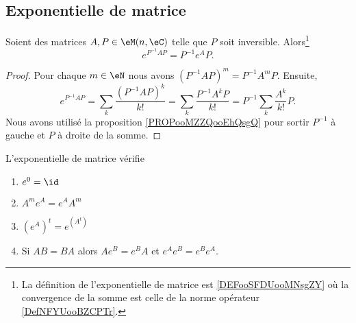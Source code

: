 \subsection{Exponentielle de matrice}
\label{SECooBYQBooZifJsg}

\begin{proposition}
    Soient des matrices \( A,P\in \eM(n,\eC)\) telle que \( P\) soit inversible. Alors\footnote{La définition de l'exponentielle de matrice est \ref{DEFooSFDUooMNsgZY} où la convergence de la somme est celle de la norme opérateur \ref{DefNFYUooBZCPTr}.}
    \begin{equation}
        e^{P^{-1}AP}=P^{-1} e^{A}P.
    \end{equation}
\end{proposition}

\begin{proof}
    Pour chaque \( m\in \eN\) nous avons \( (P^{-1}AP)^m=P^{-1} A^mP\). Ensuite,
    \begin{equation}
        e^{P^{-1}AP}=\sum_k\frac{(P^{-1}AP)^k}{ k! }=\sum_k\frac{ P^{-1}A^kP }{ k! }=P^{-1}\sum_k\frac{ A^k }{ k! }P.
    \end{equation}
    Nous avons utilisé la proposition \ref{PROPooMZZQooEhQsgQ} pour sortir \( P^{-1}\) à gauche et \( P\) à droite de la somme.
\end{proof}

\begin{proposition}       \label{PROPooFLHPooRhLiZE}
    L'exponentielle de matrice vérifie
    \begin{enumerate}
        \item       \label{ITEMooCVALooEfLQCyI}
            \( e^0=\id\)
        \item       \label{ITEMooNGPWooIyPEQt}
            \( A^m e^{A}= e^{A}A^m\)
        \item       \label{ITEMooEOSMooQWjcjA}
            \( ( e^{A})^t= e^{(A^t)}\)
        \item       \label{ITEMooROPJooMarenu}
            Si \( AB=BA\) alors \( A e^{B}= e^{B}A\) et \(  e^{A} e^{B}= e^{B} e^{A}\).
    \end{enumerate}
\end{proposition}

